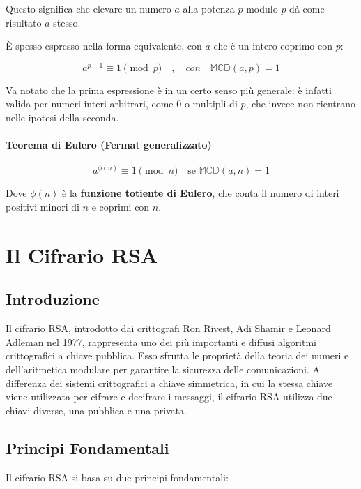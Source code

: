 \documentclass[a4paper,12pt]{report}
\begin{document}
Questo significa che elevare un numero $a$ alla potenza $p$ modulo $p$ dà come risultato $a$ stesso.

È spesso espresso nella forma equivalente, con \(a\) che è un intero coprimo con \(p\):

\[a^{p-1} \equiv 1 \pmod{p}\quad,\quad con\quad \mathbb{MCD}(a,p)=1\]

Va notato che la prima espressione è in un certo senso più generale: è infatti valida per numeri interi arbitrari, come \(0\) o multipli di \(p\), che invece non rientrano nelle ipotesi della seconda.

\subsubsection*{Teorema di Eulero (Fermat generalizzato)}

$$a^{\phi(n)} \equiv 1 \pmod{n} \quad \text{se } \mathbb{MCD}(a,n) = 1$$

Dove $\phi(n)$ è la \textbf{funzione totiente di Eulero}, che conta il numero di interi positivi minori di $n$ e coprimi con $n$.
%
%
%
%
%
%
%
%
%
%
%
%
%
%
%
%
%
%
%
%
%
%
%
%
%
%
%
%
%
%
%
%
%
%
%
%
%
%
%
%
%
\chapter{Il Cifrario RSA}

\section{Introduzione}
Il cifrario RSA, introdotto dai crittografi Ron Rivest, Adi Shamir e Leonard Adleman nel 1977, rappresenta uno dei più importanti e diffusi algoritmi crittografici a chiave pubblica. 
Esso sfrutta le proprietà della teoria dei numeri e dell'aritmetica modulare per garantire la sicurezza delle comunicazioni. 
A differenza dei sistemi crittografici a chiave simmetrica, in cui la stessa chiave viene utilizzata per cifrare e decifrare i messaggi, il cifrario RSA utilizza due chiavi diverse, una pubblica e una privata.

\section{Principi Fondamentali}
Il cifrario RSA si basa su due principi fondamentali:
\end{document}
